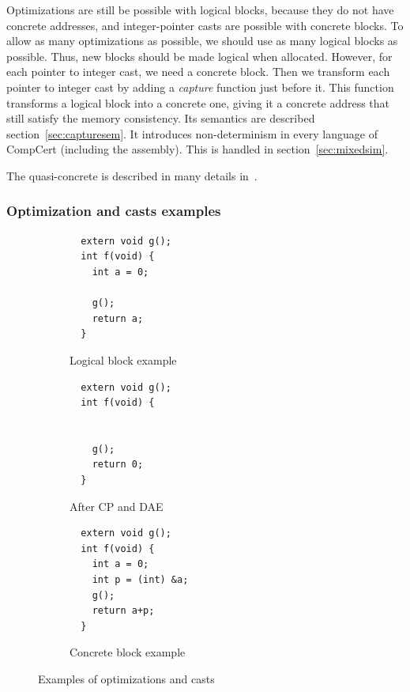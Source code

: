Optimizations are still be possible with logical blocks, because they do not have concrete addresses, and integer-pointer casts are possible with concrete blocks.
To allow as many optimizations as possible, we should use as many logical blocks as possible. Thus, new blocks should be made logical when allocated.
However, for each pointer to integer cast, we need a concrete block. Then we transform each pointer to integer cast by adding a \textit{capture} function just before it. This function transforms a logical block into a concrete one, giving it a concrete address that still satisfy the memory consistency. Its semantics are described section~\ref{sec:capturesem}.
It introduces non-determinism in every language of CompCert (including the assembly). This is handled in section~\ref{sec:mixedsim}.

The quasi-concrete is described in many details in~\cite{DBLP:conf/pldi/KangHMGZV15}.
\subsubsection{Optimization and casts examples}

\lstset{}
\begin{figure}
\begin{subfigure}{.33\textwidth}
  \begin{lstlisting}
  extern void g();
  int f(void) {
    int a = 0;
    
    g();
    return a;
  }
  \end{lstlisting}
  \caption{Logical block example}
  \label{fig:logical}
\end{subfigure}%
\begin{subfigure}{.33\textwidth}
  \begin{lstlisting}
  extern void g();
  int f(void) {

    
    g();
    return 0;
  }
  \end{lstlisting}
  \caption{After CP and DAE}
  \label{fig:cpdae}
\end{subfigure}
\begin{subfigure}{.33\textwidth}
  \begin{lstlisting}
  extern void g();
  int f(void) {
    int a = 0;
    int p = (int) &a;
    g();
    return a+p;
  }
  \end{lstlisting}
  \caption{Concrete block example}
  \label{fig:concrete}
\end{subfigure}
\caption{Examples of optimizations and casts}
\label{fig:examples}
\end{figure}

